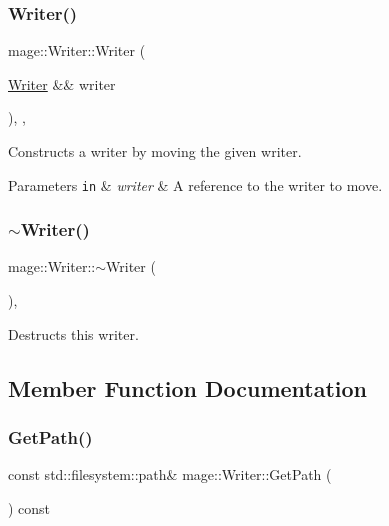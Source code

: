 \subsubsection{\texorpdfstring{Writer()}{Writer()}\hspace{0.1cm}{\footnotesize\ttfamily [3/3]}}
{\footnotesize\ttfamily mage\+::\+Writer\+::\+Writer (\begin{DoxyParamCaption}\item[{\mbox{\hyperlink{classmage_1_1_writer}{Writer}} \&\&}]{writer }\end{DoxyParamCaption})\hspace{0.3cm}{\ttfamily [protected]}, {\ttfamily [default]}, {\ttfamily [noexcept]}}

Constructs a writer by moving the given writer.


\begin{DoxyParams}[1]{Parameters}
\mbox{\tt in}  & {\em writer} & A reference to the writer to move. \\
\hline
\end{DoxyParams}
\mbox{\label{classmage_1_1_writer_aeeb30d6afb1a271b4ad294889054caec}} 
\subsubsection{\texorpdfstring{$\sim$\+Writer()}{~Writer()}}
{\footnotesize\ttfamily mage\+::\+Writer\+::$\sim$\+Writer (\begin{DoxyParamCaption}{ }\end{DoxyParamCaption})\hspace{0.3cm}{\ttfamily [protected]}, {\ttfamily [default]}}

Destructs this writer. 

\subsection{Member Function Documentation}
\mbox{\label{classmage_1_1_writer_ab023ae8174132f233c6e1fa4d3a2a1c8}} 
\subsubsection{\texorpdfstring{Get\+Path()}{GetPath()}}
{\footnotesize\ttfamily const std\+::filesystem\+::path\& mage\+::\+Writer\+::\+Get\+Path (\begin{DoxyParamCaption}{ }\end{DoxyParamCaption}) const\hspace{0.3cm}{\ttfamily [noexcept]}}

